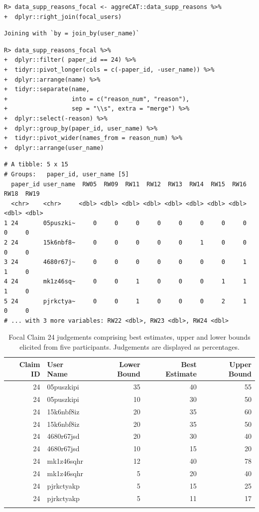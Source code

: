 \documentclass[article]{jss}
\begin{document}
\begin{verbatim}
R> data_supp_reasons_focal <- aggreCAT::data_supp_reasons %>%  
+  dplyr::right_join(focal_users)
\end{verbatim}

\begin{verbatim}
Joining with `by = join_by(user_name)`
\end{verbatim}

\begin{verbatim}
R> data_supp_reasons_focal %>%
+  dplyr::filter( paper_id == 24) %>%
+  tidyr::pivot_longer(cols = c(-paper_id, -user_name)) %>%
+  dplyr::arrange(name) %>%
+  tidyr::separate(name, 
+                  into = c("reason_num", "reason"), 
+                  sep = "\\s", extra = "merge") %>%
+  dplyr::select(-reason) %>%
+  dplyr::group_by(paper_id, user_name) %>%
+  tidyr::pivot_wider(names_from = reason_num) %>%
+  dplyr::arrange(user_name)
\end{verbatim}

\begin{verbatim}
# A tibble: 5 x 15
# Groups:   paper_id, user_name [5]
  paper_id user_name  RW05  RW09  RW11  RW12  RW13  RW14  RW15  RW16  RW18  RW19
  <chr>    <chr>     <dbl> <dbl> <dbl> <dbl> <dbl> <dbl> <dbl> <dbl> <dbl> <dbl>
1 24       05puszki~     0     0     0     0     0     0     0     0     0     0
2 24       15k6nbf8~     0     0     0     0     0     1     0     0     0     0
3 24       4680r67j~     0     0     0     0     0     0     0     1     1     0
4 24       mk1z46sq~     0     0     1     0     0     0     1     1     1     0
5 24       pjrkctya~     0     0     1     0     0     0     2     1     0     0
# ... with 3 more variables: RW22 <dbl>, RW23 <dbl>, RW24 <dbl>
\end{verbatim}

\hypertarget{tbl-reason-wagg-focal-claim}{}
\begin{longtable}{rlrrr}

\toprule
Claim ID & User Name & Lower Bound & Best Estimate & Upper Bound \\ 
\midrule
24 & 05puszkipi & 35 & 40 & 55 \\ 
24 & 05puszkipi & 10 & 30 & 50 \\ 
24 & 15k6nbf8iz & 20 & 35 & 60 \\ 
24 & 15k6nbf8iz & 20 & 35 & 50 \\ 
24 & 4680r67jsd & 20 & 30 & 40 \\ 
24 & 4680r67jsd & 10 & 15 & 20 \\ 
24 & mk1z46sqhr & 12 & 40 & 78 \\ 
24 & mk1z46sqhr & 5 & 20 & 40 \\ 
24 & pjrkctyakp & 5 & 15 & 25 \\ 
24 & pjrkctyakp & 5 & 11 & 17 \\ 
\bottomrule
\caption{\label{tbl-reason-wagg-focal-claim}Focal Claim 24 judgements comprising best estimates, upper and lower
bounds elicited from five participants. Judgements are displayed as
percentages. }\tabularnewline
\end{longtable}
\end{document}
